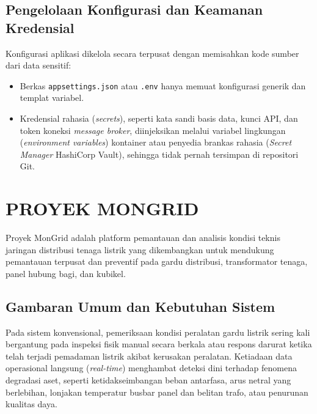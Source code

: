 \subsection{Pengelolaan Konfigurasi dan Keamanan Kredensial}

Konfigurasi aplikasi dikelola secara terpusat dengan memisahkan kode sumber dari data sensitif:
\begin{itemize}[leftmargin=*, itemsep=0pt]
  \item Berkas \texttt{appsettings.json} atau \texttt{.env} hanya memuat konfigurasi generik dan templat variabel.
  \item Kredensial rahasia (\textit{secrets}), seperti kata sandi basis data, kunci API, dan token koneksi \textit{message broker}, diinjeksikan melalui variabel lingkungan (\textit{environment variables}) kontainer atau penyedia brankas rahasia (\textit{Secret Manager} HashiCorp Vault), sehingga tidak pernah tersimpan di repositori Git.
\end{itemize}

\section{PROYEK MONGRID}

Proyek MonGrid adalah platform pemantauan dan analisis kondisi teknis jaringan distribusi tenaga listrik yang dikembangkan untuk mendukung pemantauan terpusat dan preventif pada gardu distribusi, transformator tenaga, panel hubung bagi, dan kubikel. 

\subsection{Gambaran Umum dan Kebutuhan Sistem}

Pada sistem konvensional, pemeriksaan kondisi peralatan gardu listrik sering kali bergantung pada inspeksi fisik manual secara berkala atau respons darurat ketika telah terjadi pemadaman listrik akibat kerusakan peralatan. Ketiadaan data operasional langsung (\textit{real-time}) menghambat deteksi dini terhadap fenomena degradasi aset, seperti ketidakseimbangan beban antarfasa, arus netral yang berlebihan, lonjakan temperatur busbar panel dan belitan trafo, atau penurunan kualitas daya.

